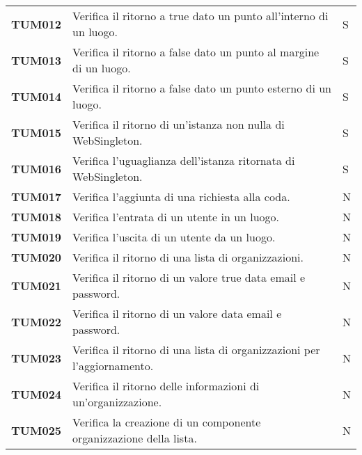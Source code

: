 \documentclass[../piano-di-qualifica.tex]{subfiles}
\begin{document}
\begin{longtable}[H]{>{\centering\bfseries}m{3cm} >{}m{10cm} >{\centering\arraybackslash}m{3cm}}
  TUM012             & Verifica il ritorno a true dato un punto all'interno di un luogo. & S\\

  TUM013             & Verifica il ritorno a false dato un punto al margine di un luogo. & S\\

  TUM014             & Verifica il ritorno a false dato un punto esterno di un luogo. & S\\

  TUM015             & Verifica il ritorno di un'istanza non nulla di WebSingleton. & S\\

  TUM016             & Verifica l'uguaglianza dell'istanza ritornata di WebSingleton. & S\\

  TUM017             & Verifica l'aggiunta di una richiesta alla coda. & N\\ %

  TUM018             & Verifica l'entrata di un utente in un luogo. & N\\ %

  TUM019             & Verifica l'uscita di un utente da un luogo. & N\\ %

  TUM020             & Verifica il ritorno di una lista di organizzazioni. & N\\ %


  TUM021             & Verifica il ritorno di un valore true data email e password. & N\\ %

  TUM022             & Verifica il ritorno di un valore data email e password. & N\\ %

  TUM023             & Verifica il ritorno di una lista di organizzazioni per l'aggiornamento. & N\\ %

  TUM024             & Verifica il ritorno delle informazioni di un'organizzazione. & N\\ %

  TUM025             & Verifica la creazione di un componente organizzazione della lista. & N\\ %


\end{longtable}
\end{document}
